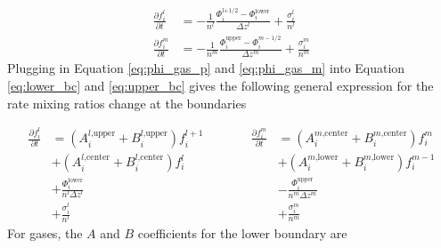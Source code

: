\begin{align}
  \frac{\partial f_i^l}{\partial t} &= - \frac{1}{n^{l}} \frac{\Phi_{i}^\text{l+1/2} - \Phi_{i}^\text{lower}}{\Delta z^l} + \frac{\sigma_i^l}{n^{l}} \label{eq:lower_bc} \\
  \frac{\partial f_i^m}{\partial t} &= - \frac{1}{n^{m}} \frac{\Phi_{i}^\text{upper} - \Phi_{i}^{m-1/2}}{\Delta z^m} + \frac{\sigma_i^m}{n^{m}} \label{eq:upper_bc}
\end{align}
Plugging in Equation \eqref{eq:phi_gas_p} and \eqref{eq:phi_gas_m} into Equation \eqref{eq:lower_bc} and \eqref{eq:upper_bc} gives the following general expression for the rate mixing ratios change at the boundaries

\begin{equation} \label{eq:dfdt_boundary}
  \begin{aligned}
    \frac{\partial f_{i}^l}{\partial t} &= (A_{i}^{l\text{,upper}}+ B_{i}^{l\text{,upper}}) f_{i}^{l+1} \\
    &+ (A_{i}^{l\text{,center}} + B_{i}^{l\text{,center}}) f_{i}^{l} \\
    &+ \frac{\Phi_i^\text{lower}}{n^l \Delta z^l} \\
    &+ \frac{\sigma_i^l}{n^{l}}
  \end{aligned}
  \quad\quad\quad
  \begin{aligned}
    \frac{\partial f_{i}^m}{\partial t} &= (A_{i}^{m\text{,center}} + B_{i}^{m\text{,center}}) f_{i}^{m} \\
    &+ (A_{i}^{m\text{,lower}} + B_{i}^{m\text{,lower}}) f_{i}^{m-1} \\
    &- \frac{\Phi_i^\text{upper}}{n^m \Delta z^m} \\
    &+ \frac{\sigma_i^m}{n^{m}}
  \end{aligned}
  \end{equation}
For gases, the $A$ and $B$ coefficients for the lower boundary are


